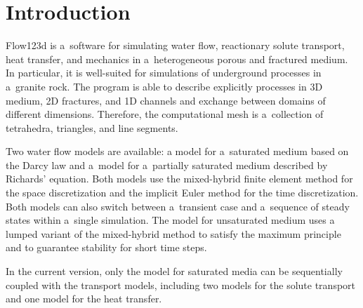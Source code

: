 %
%
%
%
%


\section{Introduction}
Flow123d is a~software for simulating water flow, reactionary solute transport, heat transfer, and mechanics in a~heterogeneous
porous and fractured medium. In particular, it is well-suited for simulations of underground processes in a~granite rock.
The program is able to describe explicitly processes in 3D medium, 2D fractures, and 1D channels and exchange between 
domains of different dimensions. Therefore, the computational mesh is a~collection of tetrahedra, triangles, and line segments.

Two water flow models are available: a model for a~saturated medium based on the Darcy law
and a~model for a~partially saturated medium described by Richards' equation.
Both models use the mixed-hybrid finite element method for the space discretization and the implicit Euler method for the time discretization.
Both models can also switch between a~transient case and a~sequence of steady states within a~single simulation. The model for unsaturated medium uses
a lumped variant of the mixed-hybrid method to satisfy the maximum principle and to guarantee stability for short time steps.

In the current version,  only the model for saturated media can be sequentially coupled  with the transport models, including
two models for the solute transport and one model for the heat transfer.

